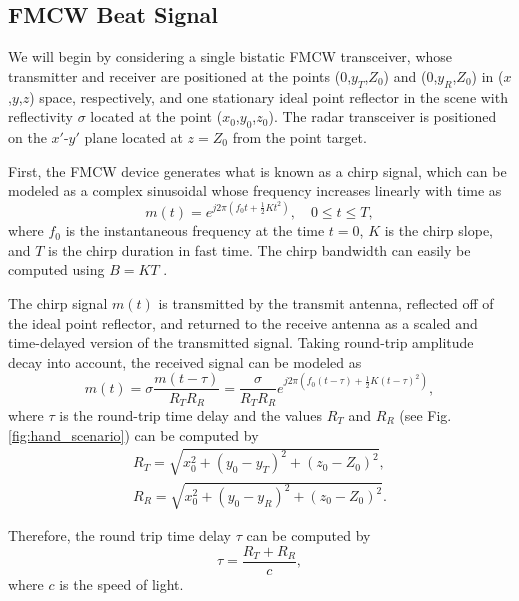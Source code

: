 \documentclass{ieeeaccess}
\begin{document}
\subsection{FMCW Beat Signal}
\label{subsec:fmcw_beat_signal}
We will begin by considering a single bistatic FMCW transceiver, whose transmitter and receiver are positioned at the points ($0$,$y_T$,$Z_0$) and ($0$,$y_R$,$Z_0$) in ($x$,$y$,$z$) space, respectively, and one stationary ideal point reflector in the scene with reflectivity $\sigma$ located at the point ($x_0$,$y_0$,$z_0$). The radar transceiver is positioned on the $x'$-$y'$ plane located at $z = Z_0$ from the point target.

First, the FMCW device generates what is known as a chirp signal, which can be modeled as a complex sinusoidal whose frequency increases linearly with time as
\begin{equation}
    m(t) = e^{j2\pi(f_0t + \frac{1}{2}Kt^2)}, \quad 0 \leq t \leq T,
\end{equation}
where $f_0$ is the instantaneous frequency at the time $t=0$, $K$ is the chirp slope, and $T$ is the chirp duration in fast time. The chirp bandwidth can easily be computed using $B = KT$ \cite{Yanik:ConcealedItemImaging}.

The chirp signal $m(t)$ is transmitted by the transmit antenna, reflected off of the ideal point reflector, and returned to the receive antenna as a scaled and time-delayed version of the transmitted signal. Taking round-trip amplitude decay into account, the received signal can be modeled as
\begin{equation}
    \hat{m}(t) = \sigma \frac{m(t-\tau)}{R_T R_R} = \frac{\sigma}{R_T R_R} e^{j2\pi(f_0(t-\tau) + \frac{1}{2}K(t-\tau)^2)},
\end{equation}
where $\tau$ is the round-trip time delay \cite{Yanik:MillimeterWaveNearFieldImaging} and the values $R_T$ and $R_R$ (see Fig. \ref{fig:hand_scenario}) can be computed by
\begin{gather}
    R_T = \sqrt{x_0^2 + (y_0-y_T)^2+(z_0-Z_0)^2}, \\
    R_R = \sqrt{x_0^2 + (y_0-y_R)^2+(z_0-Z_0)^2}.
\end{gather}

Therefore, the round trip time delay $\tau$ can be computed by
\begin{equation}
    \tau = \frac{R_T+R_R}{c},
\end{equation}
where $c$ is the speed of light.
\end{document}
